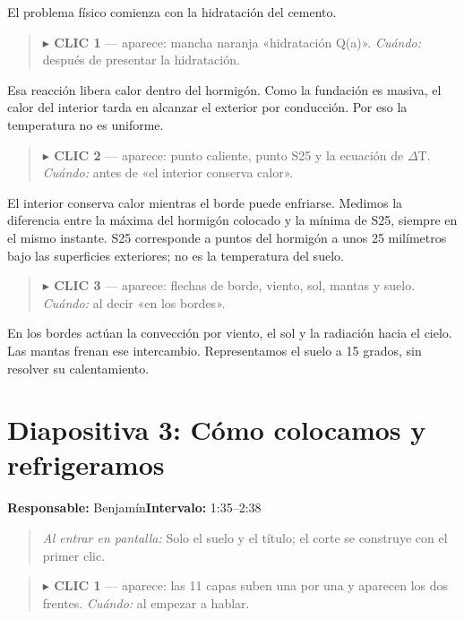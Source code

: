 \documentclass[11pt,a4paper]{article}
\newenvironment{indicacion}{\begin{quote}\small\color{grisindicacion}}{\end{quote}}
\newcommand{\lamina}[4]{%
  \section*{\color{petroleo}Diapositiva #1: #2}%
  \textbf{Responsable:} #3\hfill\textbf{Intervalo:} #4\par
}
\begin{document}
El problema físico comienza con la hidratación del cemento.



\begin{indicacion}\textbf{\ensuremath{\blacktriangleright} CLIC 1} --- aparece: mancha naranja «hidratación Q(a)». \emph{Cuándo:} después de presentar la hidratación.\end{indicacion}


Esa reacción libera calor dentro del hormigón. Como la fundación es masiva, el calor del interior tarda en alcanzar el exterior por conducción. Por eso la temperatura no es uniforme.



\begin{indicacion}\textbf{\ensuremath{\blacktriangleright} CLIC 2} --- aparece: punto caliente, punto S25 y la ecuación de \ensuremath{\Delta}T. \emph{Cuándo:} antes de «el interior conserva calor».\end{indicacion}


El interior conserva calor mientras el borde puede enfriarse. Medimos la diferencia entre la máxima del hormigón colocado y la mínima de S25, siempre en el mismo instante. S25 corresponde a puntos del hormigón a unos 25 milímetros bajo las superficies exteriores; no es la temperatura del suelo.



\begin{indicacion}\textbf{\ensuremath{\blacktriangleright} CLIC 3} --- aparece: flechas de borde, viento, sol, mantas y suelo. \emph{Cuándo:} al decir «en los bordes».\end{indicacion}


En los bordes actúan la convección por viento, el sol y la radiación hacia el cielo. Las mantas frenan ese intercambio. Representamos el suelo a 15 grados, sin resolver su calentamiento.



\clearpage

\lamina{3}{Cómo colocamos y refrigeramos}{Benjamín}{1:35--2:38}

\begin{indicacion}\emph{Al entrar en pantalla:} Solo el suelo y el título; el corte se construye con el primer clic.\end{indicacion}

\begin{indicacion}\textbf{\ensuremath{\blacktriangleright} CLIC 1} --- aparece: las 11 capas suben una por una y aparecen los dos frentes. \emph{Cuándo:} al empezar a hablar.\end{indicacion}
\end{document}
